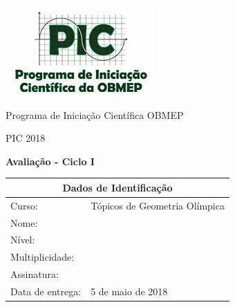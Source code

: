 \documentclass[oneside,a4paper,12pt]{article}
\theoremstyle{Colorido}
\theoremstyle{solu}
\theoremstyle{dotlessP}
\newcommand{\universidade}{Programa de Iniciação Científica OBMEP}
\newcommand{\centro}{PIC 2018}
\newcommand{\professor}{Douglas de Araujo Smigly}
\newcommand{\disciplina}{Tópicos de Geometria Olímpica}
\newcommand{\entrega}{5 de maio de 2018}
\begin{document}
	\pagestyle{empty}
	
	\begin{center}
	\includegraphics[width=\linewidth/3]{logo_pic}%
	 	\vspace{0pt}
	 	
		\universidade
		\par
		\centro
		\par
		\par
		\par
		\vspace{24pt}
		\LARGE \textbf{Avalia\c c\~ao - Ciclo I}
		
	\end{center}
	
	\vspace{24pt}
	
%		
%	
	\begin{tabular}{ |l|p{12cm}| }
		
		\hline
		\multicolumn{2}{|c|}{\textbf{Dados de Identificação}} \\
			\hline
		Curso:        &  \disciplina \\
			\hline
		Nome:        &  \\
		\hline
		Nível:      &  \\
		\hline
				Multiplicidade:      &  \\
		\hline
				Assinatura:      &  \\
		\hline
				Data de entrega:      &  \entrega \\
		\hline
	\end{tabular}
	
\end{document}
